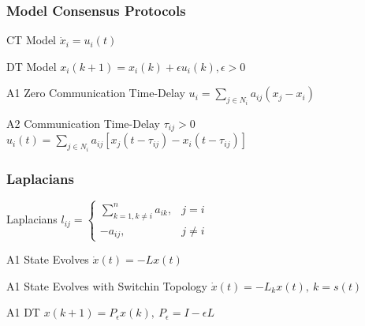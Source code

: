 \documentclass{beamer}
\begin{document}
\begin{frame}
\frametitle{Model Consensus Protocols}


\begin{block}{CT Model}
    $\dot{x}_i = u_i(t)$
\end{block}

\begin{alertblock}{DT Model}
    $x_i(k+1) = x_i(k) + \epsilon u_i(k), \epsilon>0$
\end{alertblock}


\begin{block}{A1 Zero Communication Time-Delay}
    $u_i = \sum_{j\in N_i}a_{ij}(x_j-x_i)$
\end{block}

\begin{alertblock}{A2 Communication Time-Delay $\tau_{ij}>0$}
    $u_i(t) = \sum_{j\in N_i}a_{ij}[x_j(t-\tau_{ij})-x_i(t-\tau_{ij})]$
\end{alertblock}


\end{frame}
\begin{frame}
    \frametitle{Laplacians}
    
    
    \begin{block}{Laplacians}
        $l_{ij} = \left\{
            \begin{array}{ll}
                \sum_{k=1,k\ne i}^n a_{ik}, & j=i\\
                -a_{ij}, & j\ne i
            \end{array}\right.$
    \end{block}
    
    \begin{alertblock}{A1 State Evolves}
        $\dot{x}(t) = -Lx(t)$
    \end{alertblock}
    
    
    \begin{block}{A1 State Evolves with Switchin Topology}
        $\dot{x}(t) = -L_kx(t),\ k=s(t)$
    \end{block}
    
    \begin{alertblock}{A1 DT}
        $x(k+1) = P_\epsilon x(k),\ P_\epsilon = I - \epsilon L$
    \end{alertblock}
    
    
    \end{frame}
\end{document}
